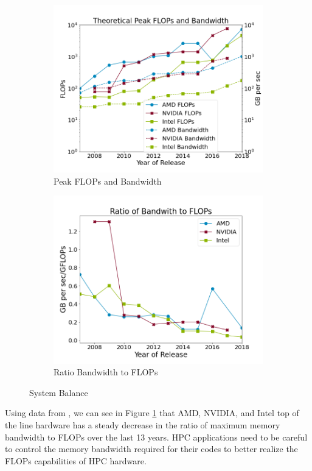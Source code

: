 \begin{figure}
\begin{subfigure}{.49\textwidth}
\includegraphics[width=.99\linewidth]{img/peakFlopsAndBandwidth}
\caption{Peak FLOPs and Bandwidth}
\end{subfigure}
\begin{subfigure}{.49\textwidth}
\includegraphics[width=.99\linewidth]{img/peakRatio}
\caption{Ratio Bandwidth to FLOPs}
\end{subfigure}
\caption{System Balance}
\label{fig:peakratio}
\end{figure}

Using data from \cite{kruppcomparison}, we can see in Figure \ref{fig:peakratio} that AMD, NVIDIA, and Intel top of the line hardware has a steady decrease in the ratio of maximum memory bandwidth to FLOPs over the last 13 years.
HPC applications need to be careful to control the memory bandwidth required for their codes to better realize the FLOPs capabilities of HPC hardware.
